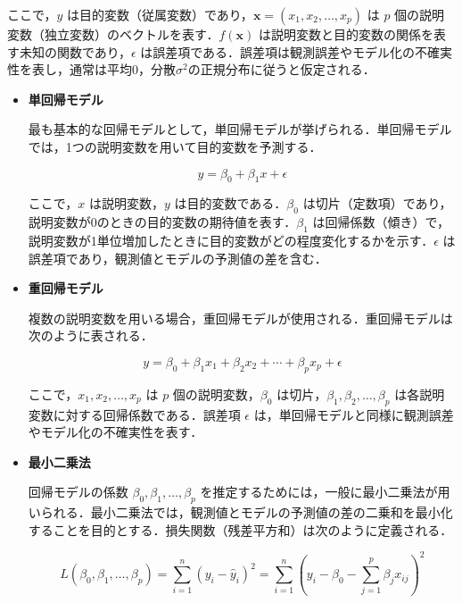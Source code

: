 ここで，$y$ は目的変数（従属変数）であり，$\mathbf{x} = (x_1, x_2, \ldots, x_p)$ は $p$ 個の説明変数（独立変数）のベクトルを表す．$f(\mathbf{x})$ は説明変数と目的変数の関係を表す未知の関数であり，$\epsilon$ は誤差項である．誤差項は観測誤差やモデル化の不確実性を表し，通常は平均0，分散$\sigma^2$の正規分布に従うと仮定される．
\begin{itemize}
	\item \textbf{単回帰モデル}
	
	最も基本的な回帰モデルとして，単回帰モデルが挙げられる．単回帰モデルでは，1つの説明変数を用いて目的変数を予測する\cite{prml}．
	
	\begin{equation}
		y = \beta_0 + \beta_1 x + \epsilon
	\end{equation}
	
	ここで，$x$ は説明変数，$y$ は目的変数である．$\beta_0$ は切片（定数項）であり，説明変数が0のときの目的変数の期待値を表す．$\beta_1$ は回帰係数（傾き）で，説明変数が1単位増加したときに目的変数がどの程度変化するかを示す．$\epsilon$ は誤差項であり，観測値とモデルの予測値の差を含む．
	
	\item \textbf{重回帰モデル}
	
	複数の説明変数を用いる場合，重回帰モデルが使用される\cite{prml}．重回帰モデルは次のように表される．
	
	\begin{equation}
		y = \beta_0 + \beta_1 x_1 + \beta_2 x_2 + \cdots + \beta_p x_p + \epsilon
	\end{equation}
	
	ここで，$x_1, x_2, \ldots, x_p$ は $p$ 個の説明変数，$\beta_0$ は切片，$\beta_1, \beta_2, \ldots, \beta_p$ は各説明変数に対する回帰係数である．誤差項 $\epsilon$ は，単回帰モデルと同様に観測誤差やモデル化の不確実性を表す．
	
	\item \textbf{最小二乗法}
	
	回帰モデルの係数 $\beta_0, \beta_1, \ldots, \beta_p$ を推定するためには，一般に最小二乗法が用いられる\cite{prml}．最小二乗法では，観測値とモデルの予測値の差の二乗和を最小化することを目的とする．損失関数（残差平方和）は次のように定義される．
	
	\begin{equation}
		L(\beta_0, \beta_1, \ldots, \beta_p) = \sum_{i=1}^{n} (y_i - \hat{y}_i)^2 = \sum_{i=1}^{n} (y_i - \beta_0 - \sum_{j=1}^{p} \beta_j x_{ij})^2
	\end{equation}
	

\end{itemize}
